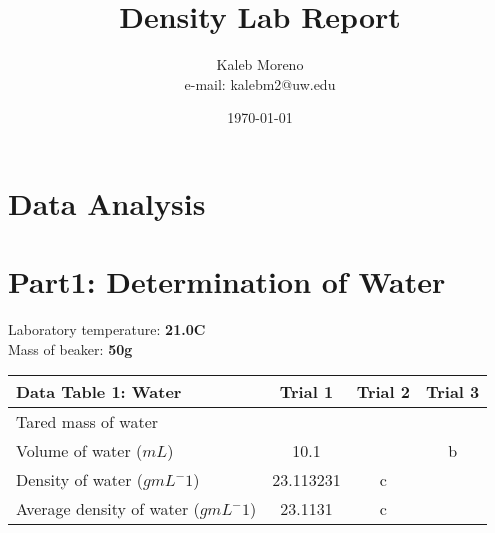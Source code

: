 \documentclass[a4paper,10pt]{article}
\begin{document}
    \title{Density Lab Report}

    \author{Kaleb Moreno \\ e-mail: kalebm2@uw.edu}
            
    \date{\today}

    \maketitle


    \newpage

    \tableofcontents
        
    \pagebreak
    \section*{Data Analysis}
    \section{Part1: Determination of Water}

        Laboratory temperature: \textbf{21.0\degree C}\\
        Mass of beaker: \textbf{50g}

        \begin{table}[h!]
            \label{tab:table1}
            \begin{tabular}{|l|c|c|c|}
                \hline
                \textbf{Data Table 1: Water} & \textbf{Trial 1} & \textbf{Trial 2} & \textbf{Trial 3}\\
                \hline
                Tared mass of water & & & \\
                \hline
                Volume of water ($mL$) & 10.1 & & b \\
                \hline
                Density of water ($g mL ^ -1$) & 23.113231 & c & \\
                \hline
                Average density of water ($g mL ^ -1$) & 23.1131 & c & \\
                \hline
            \end{tabular}
        \end{table}
\end{document}
